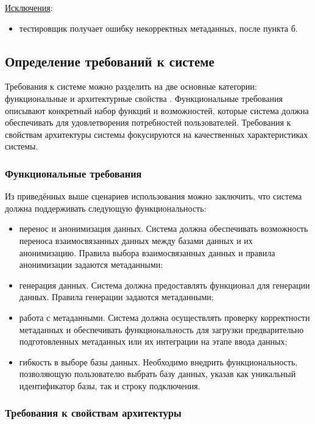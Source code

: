 \underline{Исключения}:

\begin{itemize}
    \item тестировщик получает ошибку некорректных метаданных, после пункта б.
\end{itemize}


\subsection{Определение требований к системе}

Требования к системе можно разделить на две основные категории: функциональные и архитектурные свойства \cite{arch-requirements}. Функциональные требования описывают конкретный набор функций и возможностей, которые система должна обеспечивать для удовлетворения потребностей пользователей. Требования к свойствам архитектуры системы фокусируются на качественных характеристиках системы.

\subsubsection{Функциональные требования}

Из приведённых выше сценариев использования можно заключить, что система должна поддерживать следующую функциональность:

\begin{itemize}
    \item перенос и анонимизация данных. Система должна обеспечивать возможность переноса взаимосвязанных данных между базами данных и их анонимизацию. Правила выбора взаимосвязанных данных и правила анонимизации задаются метаданными;
    \item генерация данных. Система должна предоставлять функционал для генерации данных. Правила генерации задаются метаданными;
    \item работа с метаданными. Система должна осуществлять проверку корректности метаданных и обеспечивать функциональность для загрузки предварительно подготовленных метаданных или их интеграции на этапе ввода данных;
    \item гибкость в выборе базы данных. Необходимо внедрить функциональность, позволяющую пользователю выбрать базу данных, указав как уникальный идентификатор базы, так и строку подключения.
\end{itemize}

\subsubsection{Требования к свойствам архитектуры}

